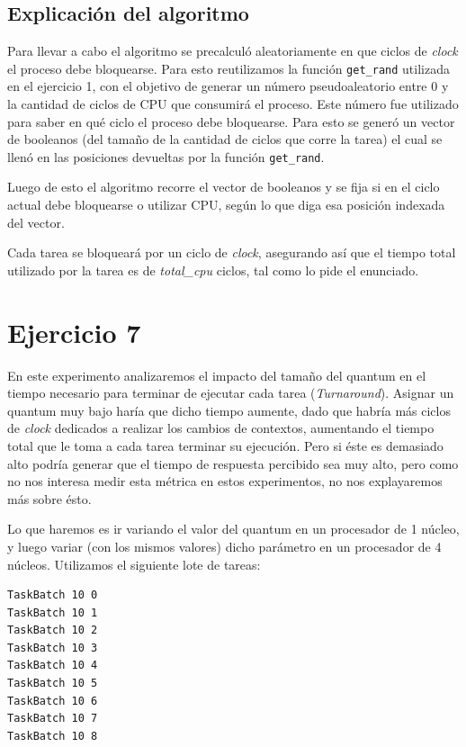 \documentclass[a4paper]{article}
\begin{document}
\subsection{Explicación del algoritmo}
Para llevar a cabo el algoritmo se precalculó aleatoriamente en que ciclos
de \textit{clock} el proceso debe bloquearse. Para esto reutilizamos la
función \verb|get_rand| utilizada en el ejercicio 1, con el objetivo de
generar un número pseudoaleatorio entre 0 y la cantidad de ciclos de CPU que
consumirá el proceso. Este número fue utilizado para saber en qué ciclo el
proceso debe bloquearse. Para esto se generó un vector de booleanos (del
tamaño de la cantidad de ciclos que corre la tarea) el cual se llenó en las
posiciones devueltas por la función \verb|get_rand|.

Luego de esto el algoritmo recorre el vector de booleanos y se fija si en
el ciclo actual debe bloquearse o utilizar CPU, según lo que diga esa
posición indexada del vector. 

Cada tarea se bloqueará por un ciclo de \textit{clock}, asegurando así que
el tiempo total utilizado por la tarea es de \textit{total\_cpu} ciclos,
tal como lo pide el enunciado.


\section{Ejercicio 7}

En este experimento analizaremos el impacto del tamaño del quantum en
el tiempo necesario para terminar de ejecutar cada tarea
(\textit{Turnaround}). Asignar un quantum
muy bajo haría que dicho tiempo aumente, dado que habría más ciclos de
\textit{clock} dedicados a realizar los cambios de contextos, aumentando el
tiempo total que le toma a cada tarea terminar su ejecución. Pero si éste es demasiado alto podría generar
que el tiempo de respuesta percibido sea muy alto, pero como no nos interesa
medir esta métrica en estos experimentos, no nos explayaremos más sobre ésto.

Lo que haremos es ir variando el valor del quantum en un procesador de 1
núcleo, y luego variar (con los mismos valores) dicho parámetro en un
procesador de 4 núcleos. Utilizamos el siguiente lote de tareas:

\begin{verbatim}
TaskBatch 10 0 
TaskBatch 10 1
TaskBatch 10 2
TaskBatch 10 3
TaskBatch 10 4
TaskBatch 10 5
TaskBatch 10 6
TaskBatch 10 7
TaskBatch 10 8
\end{verbatim}
\end{document}
